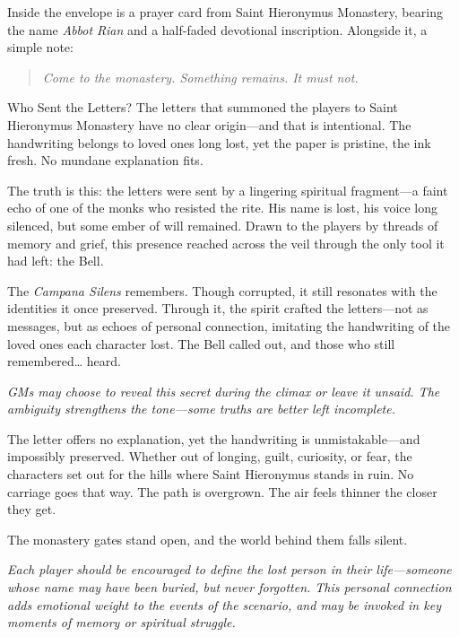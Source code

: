 \documentclass[nodeprecatedcode,bg=print]{dndbook/dndbook}
\begin{document}
Inside the envelope is a prayer card from Saint Hieronymus Monastery, bearing the name \emph{Abbot Rian} and a half-faded devotional inscription. Alongside it, a simple note:

\begin{WyrdExample}
    \begin{quote}
        \textit{Come to the monastery. Something remains. It must not.}
    \end{quote}
\end{WyrdExample}
\begin{WyrdSidebar}[float=!b]{Who Sent the Letters?}
    The letters that summoned the players to Saint Hieronymus Monastery have no clear origin—and that is intentional. The handwriting belongs to loved ones long lost, yet the paper is pristine, the ink fresh. No mundane explanation fits.
    
    The truth is this: the letters were sent by a lingering spiritual fragment—a faint echo of one of the monks who resisted the rite. His name is lost, his voice long silenced, but some ember of will remained. Drawn to the players by threads of memory and grief, this presence reached across the veil through the only tool it had left: the Bell.
    
    The \emph{Campana Silens} remembers. Though corrupted, it still resonates with the identities it once preserved. Through it, the spirit crafted the letters—not as messages, but as echoes of personal connection, imitating the handwriting of the loved ones each character lost. The Bell called out, and those who still remembered… heard.
    
    \emph{GMs may choose to reveal this secret during the climax or leave it unsaid. The ambiguity strengthens the tone—some truths are better left incomplete.}
\end{WyrdSidebar}
    
The letter offers no explanation, yet the handwriting is unmistakable—and impossibly preserved. Whether out of longing, guilt, curiosity, or fear, the characters set out for the hills where Saint Hieronymus stands in ruin. No carriage goes that way. The path is overgrown. The air feels thinner the closer they get.

The monastery gates stand open, and the world behind them falls silent.

\emph{Each player should be encouraged to define the lost person in their life—someone whose name may have been buried, but never forgotten. This personal connection adds emotional weight to the events of the scenario, and may be invoked in key moments of memory or spiritual struggle.}
\end{document}
